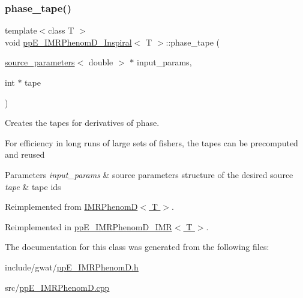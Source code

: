 \subsubsection{\texorpdfstring{phase\+\_\+tape()}{phase\_tape()}}
{\footnotesize\ttfamily template$<$class T $>$ \\
void \hyperlink{classppE__IMRPhenomD__Inspiral}{pp\+E\+\_\+\+I\+M\+R\+Phenom\+D\+\_\+\+Inspiral}$<$ T $>$\+::phase\+\_\+tape (\begin{DoxyParamCaption}\item[{\hyperlink{structsource__parameters}{source\+\_\+parameters}$<$ double $>$ $\ast$}]{input\+\_\+params,  }\item[{int $\ast$}]{tape }\end{DoxyParamCaption})\hspace{0.3cm}{\ttfamily [virtual]}}



Creates the tapes for derivatives of phase. 

For efficiency in long runs of large sets of fishers, the tapes can be precomputed and reused 
\begin{DoxyParams}{Parameters}
{\em input\+\_\+params} & source parameters structure of the desired source \\
\hline
{\em tape} & tape ids \\
\hline
\end{DoxyParams}


Reimplemented from \hyperlink{classIMRPhenomD_ae456c25f87c34487e6e05f9cf5d2d08c}{I\+M\+R\+Phenom\+D$<$ T $>$}.



Reimplemented in \hyperlink{classppE__IMRPhenomD__IMR_acf2ed8617b3e24ecc273a409ff579ce4}{pp\+E\+\_\+\+I\+M\+R\+Phenom\+D\+\_\+\+I\+M\+R$<$ T $>$}.



The documentation for this class was generated from the following files\+:\begin{DoxyCompactItemize}
\item 
include/gwat/\hyperlink{ppE__IMRPhenomD_8h}{pp\+E\+\_\+\+I\+M\+R\+Phenom\+D.\+h}\item 
src/\hyperlink{ppE__IMRPhenomD_8cpp}{pp\+E\+\_\+\+I\+M\+R\+Phenom\+D.\+cpp}\end{DoxyCompactItemize}
